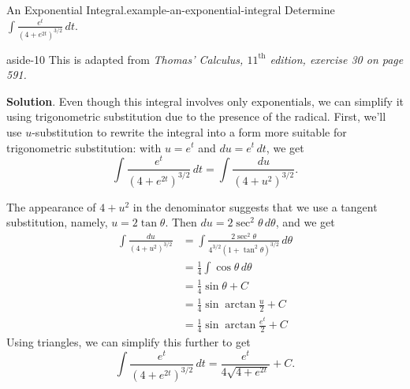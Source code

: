 \documentclass[10pt,]{book}
\numberwithin{equation}{section}
\begin{document}
\begin{example}{An Exponential Integral.}{example-an-exponential-integral}%
\hypertarget{p-545}{}%
Determine \(\displaystyle\int\frac{e^{t}}{(4 + e^{2t})^{3/2}}\,dt.\)%
\begin{aside}{}{aside-10}%
\hypertarget{p-546}{}%
This is adapted from \emph{Thomas' Calculus, \(11^{\text{th}}\) edition, exercise 30 on page 591.}%
\end{aside}
\par\smallskip%
\noindent\textbf{Solution}.\hypertarget{solution-120}{}\quad%
\hypertarget{p-547}{}%
Even though this integral involves only exponentials, we can simplify it using trigonometric substitution due to the presence of the radical. First, we'll use \(u\)-substitution to rewrite the integral into a form more suitable for trigonometric substitution: with \(u = e^{t}\) and \(du = e^{t}\,dt\), we get%
\begin{equation*}
\int\frac{e^{t}}{(4 + e^{2t})^{3/2}}\,dt = \int\frac{du}{(4 + u^{2})^{3/2}}.
\end{equation*}
%
\par
\hypertarget{p-548}{}%
The appearance of \(4 + u^{2}\) in the denominator suggests that we use a tangent substitution, namely, \(u = 2\tan\theta\). Then \(du = 2\sec^{2}\theta\,d\theta\), and we get%
\begin{align*}
\int\frac{du}{(4 + u^{2})^{3/2}} & = \int\frac{2\sec^{2}\theta}{4^{3/2}(1 + \tan^{2}\theta)^{3/2}}\,d\theta \\
& = \frac{1}{4}\int\cos\theta\,d\theta \\
& = \frac{1}{4}\sin\theta + C \\
& = \frac{1}{4}\sin\arctan\frac{u}{2} + C \\
& = \frac{1}{4}\sin\arctan\frac{e^{t}}{2} + C 
\end{align*}
Using triangles, we can simplify this further to get%
\begin{equation*}
\int\frac{e^{t}}{(4 + e^{2t})^{3/2}}\,dt = \frac{e^{t}}{4\sqrt{4 + e^{2t}}} + C.
\end{equation*}
%
\end{example}
%
%
\typeout{************************************************}
\typeout{************************************************}
%
\end{document}
